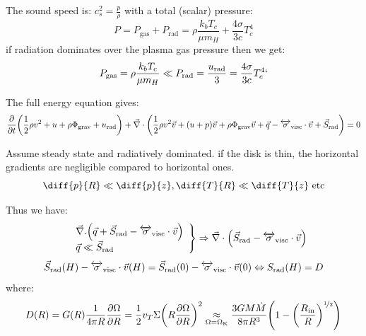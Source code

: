 \documentclass[10pt,a4paper,english]{article}
\let\originalleft\left
\let\originalright\right
\renewcommand{\left}{\mathopen{}\mathclose\bgroup\originalleft}
\renewcommand{\right}{\aftergroup\egroup\originalright}
\begin{document}
The sound speed is: $c_s^2 = \frac{p}{\rho}$ with a total (scalar) pressure:
\begin{equation}
    P = P_\mathrm{gas} + P_\mathrm{rad}  = \rho \frac{k_b T_c}{\mu m_H} + \frac{4\sigma}{3 c}T_c^4
\end{equation}
if radiation dominates over the plasma gas pressure then we get:
\begin{equation}
    P_\mathrm{gas} = \rho \frac{k_b T_c}{\mu m_H} \ll P_\mathrm{rad} = \frac{u_\mathrm{rad}}{3} = \frac{4\sigma}{3 c}T_c^4`
\end{equation}

The full energy equation gives:
\begin{equation}
    \frac{\partial}{\partial t } \left(
    \frac{1}{2}\rho v^2 + u + \rho \Phi_\mathrm{grav} + u_\mathrm{rad} \right) +
    \vec{\nabla}\cdot\left(
    \frac{1}{2}\rho v^2 \vec{v} + (u + p)\vec{v} + \rho \Phi_\mathrm{grav}\vec{v} +
    \vec{q} - \tens{\sigma}_\mathrm{visc}\cdot\vec{v} + \vec{S}_\mathrm{rad}
    \right) = 0
\end{equation}

Assume steady state and radiatively dominated. if the disk is thin, the
horizontal gradients are negligible compared to horizontal ones.
\begin{equation}
    \diff{p}{R} \ll \diff{p}{z}, \diff{T}{R} \ll \diff{T}{z}\text{  etc}
\end{equation}

Thus we have:
\begin{equation}
    \left.
    \begin{array}{ll}
        & \vec{\nabla}.\left( \vec{q}+\vec{S}_\mathrm{rad}-\tens{\sigma}_\mathrm{visc}\cdot\vec{v}\right)\\
        & \vec{q} \ll \vec{S}_\mathrm{rad}
    \end{array}
\right \}\Rightarrow \vec{\nabla}\cdot\left(\vec{S}_\mathrm{rad}-\tens{\sigma}_\mathrm{visc}\cdot\vec{v}\right)
\end{equation}
\begin{equation}
    \vec{S}_\mathrm{rad}(H) - \overleftrightarrow{\sigma}_\mathrm{visc}\cdot\vec{v}(H) = \vec{S}_\mathrm{rad}(0) - \overleftrightarrow{\sigma}_\mathrm{visc}\cdot\vec{v}(0) \Leftrightarrow
    S_\mathrm{rad}(H) = D
\end{equation}
where:
\begin{equation}
    D(R) = G(R)\frac{1}{4\pi R}\frac{\partial \Omega}{\partial R } =
    \frac{1}{2}v_T \Sigma\left(   R\frac{\partial \Omega}{\partial R }\right)^2 \underset{\mathrm{\Omega = \Omega_K}}{\approx}
    \frac{3GM\dot{M}}{8\pi R^3}\left( 1-\left(\frac{R_\mathrm{in}}{R}\right)^{\nicefrac{1}{2}}\right)
\end{equation}
\end{document}
